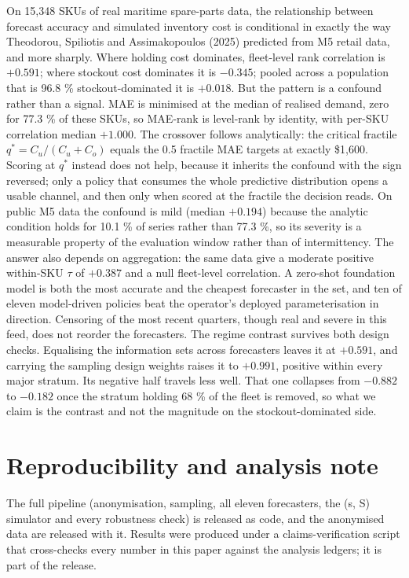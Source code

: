 \documentclass[11pt]{article}
\begin{document}
On 15{,}348 SKUs of real maritime spare-parts data, the relationship between
forecast accuracy and simulated inventory cost is conditional in exactly the
way Theodorou, Spiliotis and Assimakopoulos (2025) predicted from M5 retail
data, and more sharply. Where holding cost dominates, fleet-level rank
correlation is $+0.591$; where stockout cost dominates it is $-0.345$; pooled
across a population that is 96.8 \% stockout-dominated it is $+0.018$. But the
pattern is a confound rather than a signal. MAE is minimised at the median of
realised demand, zero for 77.3 \% of these SKUs, so MAE-rank is level-rank by
identity, with per-SKU correlation median $+1.000$. The crossover follows
analytically: the critical fractile $q^\ast = C_u/(C_u+C_o)$ equals the 0.5
fractile MAE targets at exactly \$1{,}600. Scoring at $q^\ast$ instead does not
help, because it inherits the confound with the sign reversed; only a policy
that consumes the whole predictive distribution opens a usable channel, and
then only when scored at the fractile the decision reads. On public M5 data the
confound is mild (median $+0.194$) because the analytic condition holds for
10.1 \% of series rather than 77.3 \%, so its severity is a measurable
property of the evaluation window rather than of intermittency. The
answer also depends on aggregation: the same data give a moderate positive
within-SKU $\tau$ of $+0.387$ and a null fleet-level correlation. A zero-shot
foundation model is both the most accurate and the cheapest forecaster in the
set, and ten of eleven model-driven policies beat the operator's deployed
parameterisation in direction. Censoring of the most recent quarters, though
real and severe in this feed, does not reorder the forecasters. The regime
contrast survives both design checks. Equalising the information sets across
forecasters leaves it at $+0.591$, and carrying the sampling design weights
raises it to $+0.991$, positive within every major stratum. Its negative half
travels less well. That one collapses from $-0.882$ to $-0.182$ once the
stratum holding 68 \% of the fleet is removed, so what we claim is the contrast
and not the magnitude on the stockout-dominated side.

\section*{Reproducibility and analysis note}

The full pipeline (anonymisation, sampling, all eleven forecasters, the (s, S)
simulator and every robustness check) is released as code, and the anonymised
data are released with it. Results were produced under a claims-verification
script that cross-checks every number in this paper against the analysis
ledgers; it is part of the release.
\end{document}
